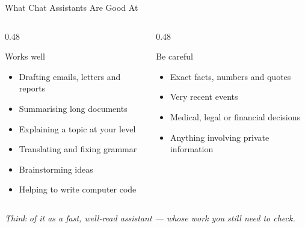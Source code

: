 \begin{frame}{What Chat Assistants Are Good At}
    \begin{columns}[T]
        \begin{column}{0.48\textwidth}
            \begin{block}{Works well}
                \begin{itemize}
                    \setlength\itemsep{0.35em}
                    \item Drafting emails, letters and reports
                    \item Summarising long documents
                    \item Explaining a topic at your level
                    \item Translating and fixing grammar
                    \item Brainstorming ideas
                    \item Helping to write computer code
                \end{itemize}
            \end{block}
        \end{column}
        \begin{column}{0.48\textwidth}
            \begin{alertblock}{Be careful}
                \begin{itemize}
                    \setlength\itemsep{0.35em}
                    \item Exact facts, numbers and quotes
                    \item Very recent events
                    \item Medical, legal or financial decisions
                    \item Anything involving private information
                \end{itemize}
            \end{alertblock}
        \end{column}
    \end{columns}

    \vspace{0.8em}
    \centering
    \textit{Think of it as a fast, well-read assistant --- whose work you still need to check.}
\end{frame}

